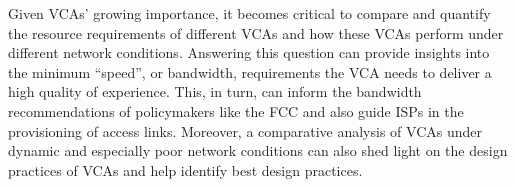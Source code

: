 
Given VCAs' growing importance, it becomes critical to compare and quantify the resource requirements of different VCAs and how these VCAs perform under different network conditions. Answering this question can provide insights into the minimum  ``speed'', or bandwidth, requirements the VCA needs to deliver a high quality of experience. %
This, in turn, can inform the bandwidth recommendations of policymakers like the FCC and also guide ISPs in the provisioning of access links. Moreover, a comparative analysis of VCAs under dynamic and especially poor network conditions can also shed light on the design practices of VCAs and help identify best design practices.



